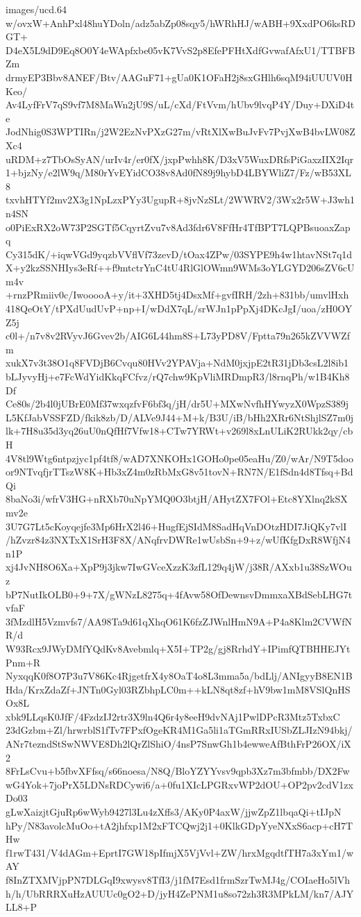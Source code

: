 \begin{filecontents*}{images/ucd.64}
w/ovxW+AnhPxl48huYDoln/adz5abZp08sqy5/hWRhHJ/wABH+9XxdPO6ksRDGT+
D4eX5L9dD9Eq8O0Y4eWApfxbe05vK7VvS2p8EfePFHtXdfGvwafAfxU1/TTBFBZm
drmyEP3Bbv8ANEF/Btv/AAGuF71+gUa0K1OFaH2j8sxGHlh6sqM94iUUUV0HKeo/
Av4LyfFrV7qS9vf7M8MaWn2jU9S/uL/cXd/FtVvm/hUbv9lvqP4Y/Duy+DXiD4te
JodNhig0S3WPTIRn/j2W2EzNvPXzG27m/vRtXlXwBuJvFv7PvjXwB4bvLW08ZXc4
uRDM+z7TbOsSyAN/urIv4r/er0fX/jxpPwhh8K/D3xV5WuxDRfsPiGaxzIIX2Iqr
1+bjzNy/e2lW9q/M80rYvEYidCO38v8Ad0fN89j9hybD4LBYWliZ7/Fz/wB53XL8
txvhHTYf2mv2X3g1NpLzxPYy3UgupR+8jvNzSLt/2WWRV2/3Wx2r5W+J3wh1n4SN
o0PiExRX2oW73P2SGTf5CqyrtZvu7v8Ad3fdr6V8FfHr4TfBPT7LQPBsuoaxZapq
Cy315dK/+iqwVGd9yqzbVVflVf73zevD/tOax4ZPw/03SYPE9h4w1htavNSt7q1d
X+y2kzSSNHIys3eRf++f9mtctrYnC4tU4RlGlOWmn9WMs3oYLGYD206sZV6cUm4v
+rnzPRmiiv0c/IwooooA+y/it+3XHD5tj4DsxMf+gvfIRH/2zh+831bb/umvlHxh
418QeOtY/tPXdUudUvP+np+I/wDdX7qL/srWJn1pPpXj4DKcJgI/uoa/zH0OYZ5j
c0l+/n7v8v2RVyvJ6Gvev2b/AIG6L44hm8S+L73yPD8V/Fptta79n265kZVVWZfm
xukX7v3t38O1q8FVDjB6Cvqu80HVv2YPAVja+NdM0jxjpE2tR31jDb3csL2l8ib1
bLJyvyHj+e7FcWdYidKkqFCfvz/rQ7chw9KpVliMRDmpR3/l8rnqPh/w1B4Kh8Df
Ce80s/2b4l0jUBrE0Mf37wxqzfvF6bf3q/jH/dr5U+MXwNvfhHYwyzX0WpzS389j
L5KfJabVSSFZD/fkik8zb/D/ALVe9J44+M+k/B3U/iB/bHh2XRr6NtShjlSZ7m0j
lk+7H8u35d3yq26uU0nQfHf7Vfw18+CTw7YRWt+v269l8xLnULiK2RUkk2qy/cbH
4V8tl9Wtg6ntpzjyc1pf4tf8/wAD7XNKOHx1GOHo0pe05eaHu/Z0/wAr/N9T5doo
or9NTvqfjrTTszW8K+Hb3xZ4m0zRbMxG8v51tovN+RN7N/E1fSdn4d8Tfsq+BdQi
8baNo3i/wfrV3HG+nRXb70uNpYMQ0O3btjH/AHytZX7FOl+Etc8YXlnq2kSXmv2e
3U7G7Lt5cKoyqejfe3Mp6HrX2l46+HugfEjSIdM8SadHqVnDOtzHDI7JiQKy7vlI
/hZvzr84z3NXTxX1SrH3F8X/ANqfrvDWRe1wUsbSn+9+z/wUfKfgDxR8WfjN4n1P
xj4JvNH8O6Xa+XpP9j3jkw7IwGVceXzzK3zfL129q4jW/j38R/AXxb1u38SzWOuz
bP7NutIkOLB0+9+7X/gWNzL8275q+4fAvw58OfDewnsvDmmxaXBdSebLHG7tvfaF
3fMzdlH5Vzmvfs7/AA98Ta9d61qXhqO61K6fzZJWnlHmN9A+P4a8Klm2CVWfNR/d
W93Rcx9JWyDMfYQdKv8Avebmlq+X5I+TP2g/gj8RrhdY+IPimfQTBHHEJYtPnm+R
NyxqqK0f8O7P3u7V86Kc4RjgetfrX4y8OaT4o8L3mma5a/bdLlj/ANIgyyB8EN1B
Hda/KrxZdaZf+JNTn0Gyl03RZbhpLC0m++kLN8qt8zf+hV9bw1mM8VSlQnHSOx8L
xbk9LLqsK0JfF/4FzdzIJ2rtr3X9ln4Q6r4y8eeH9dvNAj1PwlDPcR3Mtz5TxbxC
23dGzbm+Zl/hrwrblS1fTv7FPxfOgeKR4M1Ga5li1aTGmRRxIUSbZLJIzN94bkj/
ANr7tezndStSwNWVE8Dh2lQrZlShiO/4nsP7SnwGh1b4ewweAfBthFrP26OX/iX2
8FrLsCvu+b5fbvXFfsq/s66noesa/N8Q/BloYZYYvsv9qpb3Xz7m3bfmbb/DX2Fw
wG4Yok+7joPrX5LDNsRDCywi6/a+0fu1XIcLPGRxvWP2dOU+OP2pv2cdV1zxDo03
gLwXaizjtGjuRp6wWyb9427l3Lu4zXffs3/AKy0P4axW/jjwZpZ1lbqaQi+tIJpN
hPy/N83avolcMuOo+tA2jhfxp1M2xFTCQwj2j1+0KlkGDpYyeNXxS6acp+cH7THw
f1rwT431/V4dAGm+EprtI7GW18pIfmjX5VjVvl+ZW/hrxMgqdtfTH7a3xYm1/wAY
f8InZTXMVjpPN7DLGqI9xwysv8TfI3/j1fM7Esd1frmSzrTwMJ4g/COIaeHo5lVh
h/h/UbRRRXuHzAUUUc0gO2+D/jyH4ZePNM1u8so72zh3R3MPkLM/kn7/AJYLL8+P

\end{filecontents*}
